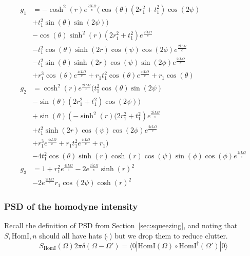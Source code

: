 \documentclass[aps,pra,superscriptaddress,reprint,nofootinbib]{revtex4-1}
\begin{document}
\begingroup
\allowdisplaybreaks
\begin{align}
g_1 &= -\cosh ^2(r) e^{\frac{2 i L \Omega }{c}} (\cos (\theta ) \left(2 r_1^2+t_1^2\right) \cos (2 \psi )\\
	&+t_1^2	\sin (\theta ) \sin (2 \psi )) \nonumber\\
	&-\cos (\theta ) \sinh ^2(r) \left(2 r_1^2+t_1^2\right) e^{\frac{2 i L \Omega
	}{c}}\nonumber\\
	&-t_1^2 \cos (\theta ) \sinh (2 r) \cos (\psi ) \cos (2 \phi ) e^{\frac{2 i L \Omega }{c}}\nonumber\\
	&-t_1^2 \sin (\theta )
	\sinh (2 r) \cos (\psi ) \sin (2 \phi ) e^{\frac{2 i L \Omega }{c}}\nonumber\\
	&+r_1^3 \cos (\theta ) e^{\frac{4 i L \Omega
	}{c}}+r_1 t_1^2 \cos (\theta ) e^{\frac{4 i L \Omega }{c}}+r_1 \cos (\theta ) \nonumber\\
g_2 &= \cosh ^2(r) e^{\frac{2 i L \Omega }{c}} (t_1^2 \cos (\theta ) \sin (2 \psi )\\
	&-\sin (\theta ) \left(2 r_1^2+t_1^2\right) \cos (2 \psi ))\nonumber\\
	&+\sin (\theta ) \left(-\sinh ^2(r) (2 r_1^2+t_1^2\right)
	e^{\frac{2 i L \Omega }{c}}\nonumber\\
	&+t_1^2 \sinh (2 r) \cos (\psi ) \cos (2 \phi ) e^{\frac{2 i L \Omega }{c}}\nonumber\\
	&+r_1^3	e^{\frac{4 i L \Omega }{c}}+r_1 t_1^2 e^{\frac{4 i L \Omega }{c}}+r_1)\nonumber\\
	&-4 t_1^2 \cos (\theta ) \sinh (r) \cosh (r) \cos (\psi ) \sin (\phi ) \cos (\phi ) e^{\frac{2 i L \Omega }{c}} \nonumber\\
g_3 &= 1 + r_1^2 e^{\frac{4 i L \Omega}{c}} - 2 e^{\frac{2 i L \Omega}{c}} \sinh(r)^2 \\
	&- 2 e^{\frac{2 i L \Omega}{c}} r_1 \cos(2 \psi) \cosh(r)^2 \nonumber
\end{align}
\endgroup

\subsubsection{PSD of the homodyne intensity}

Recall the definition of PSD from Section~\ref{sec:squeezing}, and noting that $S, \mathrm{HomI}, n$ should all have hats (\,$\hat{}$\,) but we drop them to reduce clutter.
\begin{equation}
S_\mathrm{HomI}(\Omega) 2 \pi \delta(\Omega - \Omega') = \langle0| \mathrm{HomI}(\Omega) \circ \mathrm{HomI}^\dagger(\Omega') |0\rangle
\end{equation}
\end{document}
